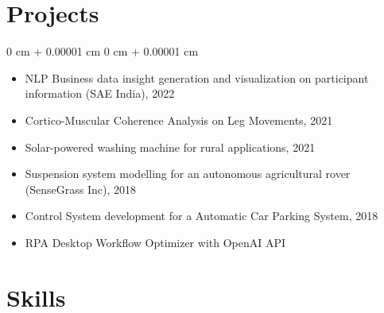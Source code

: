 \documentclass[10pt, letterpaper]{article}
\newenvironment{onecolentry}{
    \begin{adjustwidth}{
        0 cm + 0.00001 cm
    }{
        0 cm + 0.00001 cm
    }
  }{
      \end{adjustwidth}
  } %
\begin{document}
  \section{Projects}

    \begin{onecolentry}
        \begin{itemize}
        
            \item NLP Business data insight generation and visualization on participant information (SAE India), 2022
        
            \item Cortico-Muscular Coherence Analysis on Leg Movements, 2021
        
            \item Solar-powered washing machine for rural applications, 2021
        
            \item Suspension system modelling for an autonomous agricultural rover (SenseGrass Inc), 2018
        
            \item Control System development for a Automatic Car Parking System, 2018
        
            \item RPA Desktop Workflow Optimizer with OpenAI API
        
        \end{itemize}
        \end{onecolentry}

    \section{Skills}
\end{document}
